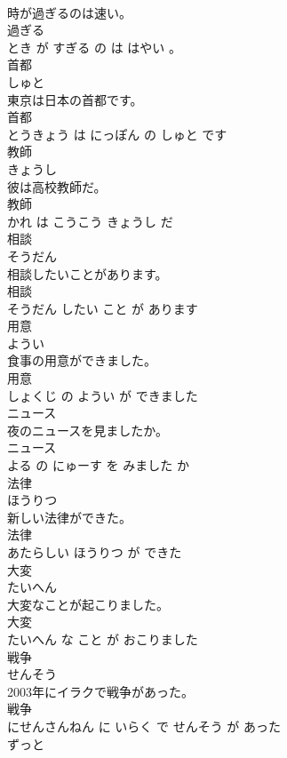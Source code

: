 \documentclass[8pt]{extreport}
\begin{document}
\begin{CJK}{UTF8}{min}
\\	時が過ぎるのは速い。	
\\	過ぎる 
\\	とき が すぎる の は はやい 。			
\\	首都	
\\	しゅと			
\\	東京は日本の首都です。	
\\	首都 
\\	とうきょう は にっぽん の しゅと です			
\\	教師	
\\	きょうし			
\\	彼は高校教師だ。	
\\	教師 
\\	かれ は こうこう きょうし だ			
\\	相談	
\\	そうだん			
\\	相談したいことがあります。	
\\	相談 
\\	そうだん したい こと が あります			
\\	用意	
\\	ようい			
\\	食事の用意ができました。	
\\	用意 
\\	しょくじ の ようい が できました			
\\	ニュース	
\\	夜のニュースを見ましたか。	
\\	ニュース 
\\	よる の にゅーす を みました か			
\\	法律	
\\	ほうりつ			
\\	新しい法律ができた。	
\\	法律 
\\	あたらしい ほうりつ が できた			
\\	大変	
\\	たいへん			
\\	大変なことが起こりました。	
\\	大変 
\\	たいへん な こと が おこりました			
\\	戦争	
\\	せんそう			
\\	2003年にイラクで戦争があった。	
\\	戦争 
\\	にせんさんねん に いらく で せんそう が あった			
\\	ずっと	

\end{CJK}
\end{document}
